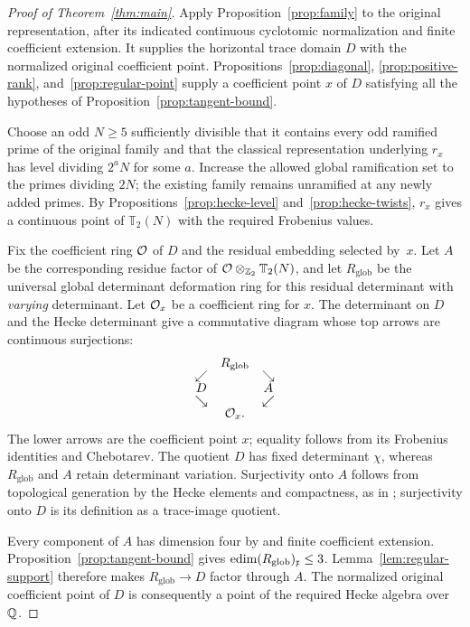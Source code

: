 \begin{proof}[Proof of Theorem~\ref{thm:main}]
Apply Proposition~\ref{prop:family} to the original representation,
after its indicated continuous cyclotomic normalization and finite
coefficient extension.  It supplies the horizontal trace domain
$D$ with the normalized original coefficient point.
Propositions~\ref{prop:diagonal}, \ref{prop:positive-rank},
and~\ref{prop:regular-point} supply a coefficient point $x$ of
$D$ satisfying all the hypotheses of
Proposition~\ref{prop:tangent-bound}.

Choose an odd $N\geq5$ sufficiently divisible that it contains
every odd ramified prime of the original family and that the
classical representation underlying $r_x$ has level dividing
$2^aN$ for some $a$.  Increase the allowed global ramification
set to the primes dividing $2N$; the existing family remains
unramified at any newly added primes.  By
Propositions~\ref{prop:hecke-level} and~\ref{prop:hecke-twists},
$r_x$ gives a continuous point of $\mathbb T_2(N)$ with the
required Frobenius values.

Fix the coefficient ring $\mathcal O$ of $D$ and the residual embedding
selected by~$x$.  Let $A$ be the corresponding residue factor
of $\mathcal O\otimes_{\mathbb Z_2}\mathbb T_2(N)$, and let
$R_{\mathrm{glob}}$ be the universal global determinant deformation
ring for this residual determinant with \emph{varying} determinant.
Let $\mathcal O_x$ be a coefficient ring for $x$. The determinant on $D$
and the Hecke determinant give a commutative diagram whose top
arrows are continuous surjections:
\[
 \begin{array}{ccc}
   &R_{\mathrm{glob}}&\\[-2pt]
   \swarrow&&\searrow\\[-2pt]
   D&&A\\[-2pt]
   \searrow&&\swarrow\\[-2pt]
   &\mathcal O_x.&
 \end{array}
\]
The lower arrows are the coefficient point $x$; equality follows
from its Frobenius identities and Chebotarev.  The quotient $D$
has fixed determinant $\chi$, whereas $R_{\mathrm{glob}}$ and
$A$ retain determinant variation.  Surjectivity onto $A$ follows
from topological generation by the Hecke elements and compactness,
as in \cite[Proposition~2.3]{Dim}; surjectivity onto $D$ is its
definition as a trace-image quotient.

Every component of $A$ has dimension four by
\cite[Theorem~1.1]{Dim} and finite coefficient extension.
Proposition~\ref{prop:tangent-bound} gives
$\operatorname{edim}(R_{\mathrm{glob}})_{\mathfrak x}\leq3$.
Lemma~\ref{lem:regular-support} therefore makes
$R_{\mathrm{glob}}\to D$ factor through $A$.
The normalized original coefficient point of $D$ is consequently
a point of the required Hecke algebra over~$\mathbb Q$.


\end{proof}
